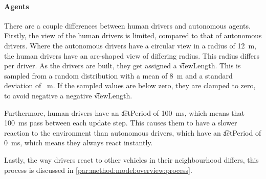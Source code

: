 

\paragraph{Agents}
There are a couple differences between human drivers and autonomous agents. Firstly, the view of the human drivers is limited, compared to that of autonomous drivers. Where the autonomous drivers have a circular view in a radius of \si{12 \meter}, the human drivers have an arc-shaped view of differing radius. This radius differs per driver. As the drivers are built, they get assigned a \t{viewLength}. This is sampled from a random distribution with a mean of \si{8 \meter} and a standard deviation of \si{ \meter}. If the sampled values are below zero, they are clamped to zero, to avoid negative a negative \t{viewLength}. 

Furthermore, human drivers have an \t{actPeriod} of \SI{100}{\milli\second}, which means that \SI{100}{\milli\second} pass between each update step. This causes them to have a slower reaction to the environment than autonomous drivers, which have an \t{actPeriod} of \SI{0}{\milli\second}, which means they always react instantly. 

Lastly, the way drivers react to other vehicles in their neighbourhood differs, this process is discussed in  \cref{par:method:model:overview:process}. 




